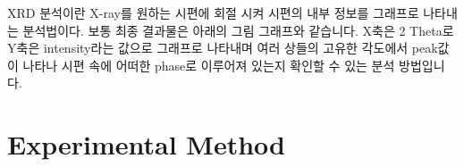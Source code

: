 \documentclass[a4paper, 10pt, nanum]{CSUniSchoolLabReport}
\begin{document}
	XRD 분석이란 X-ray를 원하는 시편에 회절 시켜 시편의 내부 정보를 그래프로 나타내는 분석법이다. 보통 최종 결과물은 아래의 그림 그래프와 같습니다. X축은 2 Theta로 Y축은 intensity라는 값으로 그래프로 나타내며 여러 상들의 고유한 각도에서 peak값이 나타나 시편 속에 어떠한 phase로 이루어져 있는지 확인할 수 있는 분석 방법입니다.


\section{Experimental Method}

\end{document}
